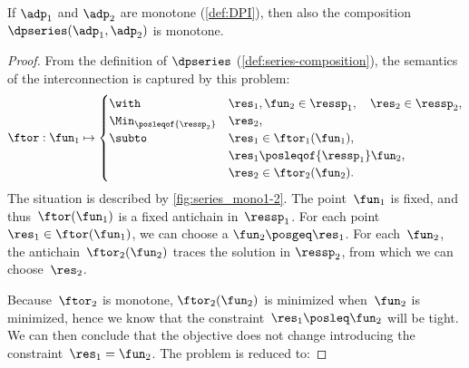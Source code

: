 \begin{proposition}
	\label{prop:series-monotone}
	If $\adp_{1}$ and $\adp_{2}$ are monotone (\cref{def:DPI}), then also the composition $\dpseries(\adp_{1},\adp_{2})$ is monotone.
\end{proposition}
\begin{proof}
	From the definition of $\dpseries$ (\cref{def:series-composition}), the semantics of the interconnection is captured by this problem:
	\begin{equation}
		\ftor:\fun_{1}\mapsto\begin{cases}
			\with                        & \res_{1},\fun_{2}\in\ressp_{1},\quad\res_{2}\in\ressp_{2}, \\
			\Min_{\posleqof{\ressp_{2}}} & \res_{2},                                                  \\
			\subto                       & \res_{1}\in\ftor_{1}(\fun_{1}),                            \\
			                             & \res_{1}\posleqof{\ressp_{1}}\fun_{2},                     \\
			                             & \res_{2}\in\ftor_{2}(\fun_{2}).
		\end{cases}\label{eq:dede}
	\end{equation}
	The situation is described by \cref{fig:series_mono1-2}.
	The point~$\fun_{1}$ is fixed, and thus~$\ftor(\fun_{1})$ is a fixed antichain in~$\ressp_{1}$.
	For each point $\res_{1}\in\ftor(\fun_{1})$, we can choose a $\fun_{2}\posgeq\res_{1}$.
	For each~$\fun_{2}$, the antichain~$\ftor_{2}(\fun_{2})$ traces the solution in $\ressp_{2}$, from which we can choose~$\res_{2}$.


	Because~$\ftor_{2}$ is monotone, $\ftor_{2}(\fun_{2})$ is minimized when~$\fun_{2}$ is minimized, hence we know that the constraint~$\res_{1}\posleq\fun_{2}$ will be tight.
	We can then conclude that the objective does not change introducing the constraint~$\res_{1}=\fun_{2}$.
	The problem is reduced to:


\end{proof}
